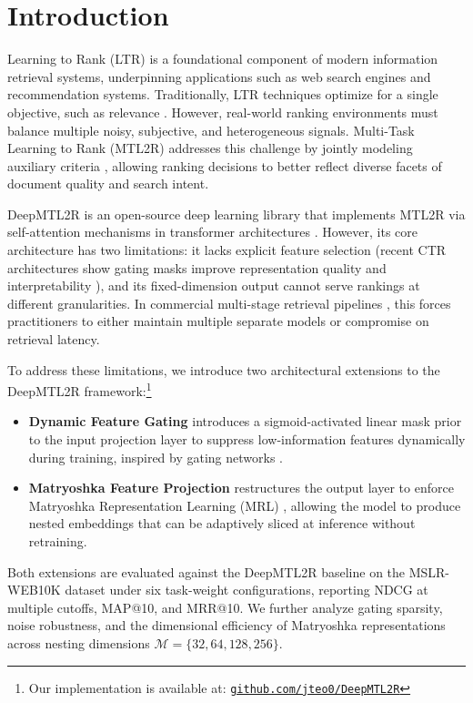 \section{Introduction}

Learning to Rank (LTR) is a foundational component of modern information retrieval systems, underpinning applications such as web search engines and recommendation systems. Traditionally, LTR techniques optimize for a single objective, such as relevance \cite{yan2023learningrankgradesmatter}. However, real-world ranking environments must balance multiple noisy, subjective, and heterogeneous signals. Multi-Task Learning to Rank (MTL2R) addresses this challenge by jointly modeling auxiliary criteria \cite{Caruana1997MultitaskL}, allowing ranking decisions to better reflect diverse facets of document quality and search intent.

DeepMTL2R is an open-source deep learning library that implements MTL2R via self-attention mechanisms in transformer architectures \cite{dong2026deepmtl2rlibrarydeepmultitask}. However, its core architecture has two limitations: it lacks explicit feature selection (recent CTR architectures show gating masks improve representation quality and interpretability \cite{huang2020gatenet,wang2021masknet}), and its fixed-dimension output cannot serve rankings at different granularities. In commercial multi-stage retrieval pipelines \cite{covington2016deep}, this forces practitioners to either maintain multiple separate models or compromise on retrieval latency.

To address these limitations, we introduce two architectural extensions to the DeepMTL2R framework:\footnote{Our implementation is available at: \href{https://github.com/jteo0/DeepMTL2R}{\texttt{github.com/jteo0/DeepMTL2R}}}
\begin{itemize}
    \item \textbf{Dynamic Feature Gating} introduces a sigmoid-activated linear mask prior to the input projection layer to suppress low-information features dynamically during training, inspired by gating networks \cite{huang2020gatenet,wang2021masknet}.
    \item \textbf{Matryoshka Feature Projection} restructures the output layer to enforce Matryoshka Representation Learning (MRL) \cite{kusupati2022matryoshka}, allowing the model to produce nested embeddings that can be adaptively sliced at inference without retraining.
\end{itemize}

Both extensions are evaluated against the DeepMTL2R baseline on the MSLR-WEB10K dataset under six task-weight configurations, reporting NDCG at multiple cutoffs, MAP@10, and MRR@10. We further analyze gating sparsity, noise robustness, and the dimensional efficiency of Matryoshka representations across nesting dimensions $\mathcal{M} = \{32, 64, 128, 256\}$.